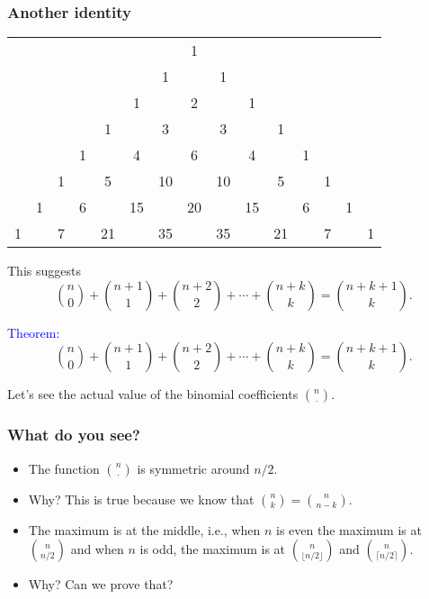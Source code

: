 \begin{frame}\frametitle{Another identity}
  \begin{tcolorbox}
    {\footnotesize
      \begin{tabular}{ccccccccccccccc}
        & & & & & & & 1 & & & & & & & \\
        & & & & & & 1 & & 1 & & & & & & \\
        & & & & & 1 & & 2 & & 1 & & & & & \\
        & & & & 1 & & 3 & & 3 & & 1 & & & & \\
        & & & 1 & & 4 & & 6 & & 4 & & 1 & & & \\
        & & 1 & & 5 & & 10 & & 10 & & 5 & & 1 & & \\
        & 1 & & 6 & & 15 & & 20 & & 15 & & 6 & & 1 & \\
        1 & & 7 & & 21 & & 35 & & 35 & & 21 & & 7 & & 1 \\
      \end{tabular}
    }
  \end{tcolorbox}
  \pause

  This suggests
  \[
  \binom{n}{0} + \binom{n+1}{1} + \binom{n+2}{2} + \cdots + \binom{n+k}{k} = \binom{n+k+1}{k}.
  \]
\end{frame}

\begin{frame}
  \textcolor{blue}{Theorem:}
  \[
  \binom{n}{0} + \binom{n+1}{1} + \binom{n+2}{2} + \cdots + \binom{n+k}{k} = \binom{n+k+1}{k}.
  \]
  \vspace{2.5in}
\end{frame}

\begin{frame}
  Let's see the actual value of the binomial coefficients
  $\binom{n}{\cdot}$.
  \vspace{2in}
\end{frame}

\begin{frame}\frametitle{What do you see?}
  \begin{itemize}
  \item The function $\binom{n}{\cdot}$ is symmetric around $n/2$.
  \item Why? \pause This is true because we know that $\binom{n}{k}=\binom{n}{n-k}$. \pause
  \item The maximum is at the middle, i.e., when $n$ is even the
    maximum is at $\binom{n}{n/2}$ and when $n$ is odd, the maximum is
    at $\binom{n}{\lfloor n/2 \rfloor}$ and $\binom{n}{\lceil
      n/2\rceil}$.
  \item Why? \pause Can we prove that?
  \end{itemize}
\end{frame}

